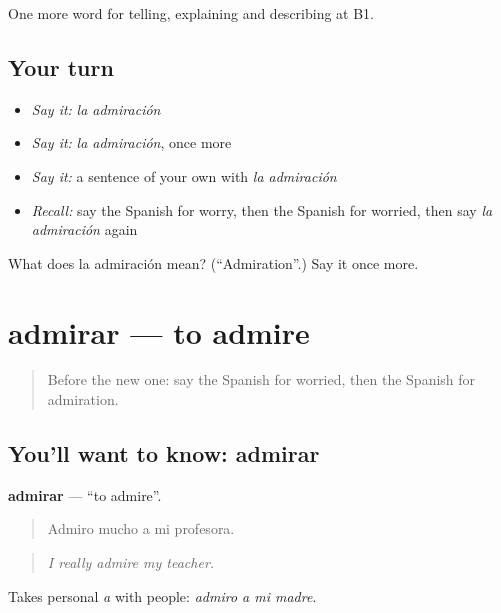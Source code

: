 \begin{grammarlens}[title={What you've built}]
One more word for telling, explaining and describing at B1.
\end{grammarlens}

\subsection*{Your turn}
\begin{itemize}
\raggedright
  \item \emph{Say it:} \emph{la admiración}
  \item \emph{Say it:} \emph{la admiración}, once more
  \item \emph{Say it:} a sentence of your own with \emph{la admiración}
  \item \emph{Recall:} say the Spanish for worry, then the Spanish for worried, then say \emph{la admiración} again
\end{itemize}

\begin{tcolorbox}[breakable,colback=teal!4,colframe=teal!35!black,title={Before you move on}]
What does la admiración mean? (\textquotedblleft{}Admiration\textquotedblright{}.) Say it once more.
\end{tcolorbox}
\section[admirar]{admirar — to admire}

\label{lesson:ES-C720-admirar}



\begin{quote}
Before the new one: say the Spanish for worried, then the Spanish for admiration.
\end{quote}

\subsection*{You'll want to know: admirar}
\textbf{admirar} — \textquotedblleft{}to admire\textquotedblright{}.

\begin{quote}
Admiro mucho a mi profesora.
\end{quote}

\begin{quote}
\emph{I really admire my teacher.}
\end{quote}

Takes personal \emph{a} with people: \emph{admiro a mi madre}.

